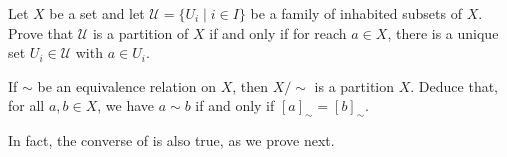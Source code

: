 \begin{exercise}
\label{exConditionsForPartition}
Let $X$ be a set and let $\mathcal{U} = \{ U_i \mid i \in I \}$ be a family of inhabited subsets of $X$. Prove that $\mathcal{U}$ is a partition of $X$ if and only if for reach $a \in X$, there is a unique set $U_i \in \mathcal{U}$ with $a \in U_i$.
\end{exercise}

\begin{exercise}
\label{exQuotientIsPartition}
If $\sim$ be an equivalence relation on $X$, then $X/{\sim}$ is a partition $X$. Deduce that, for all $a,b \in X$, we have $a \sim b$ if and only if $[a]_{\sim} = [b]_{\sim}$.
\end{exercise}

In fact, the converse of  is also true, as we prove next.

